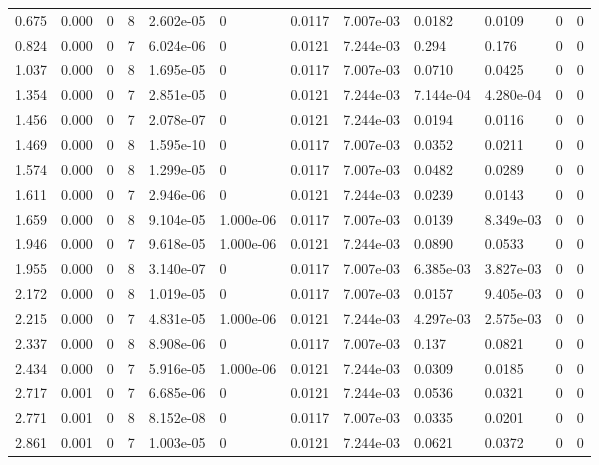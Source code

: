 \documentclass[preview]{standalone}
\begin{document}
{{\begin{tabular}{L{1.2cm}C{1.2cm} C{0.3cm}C{0.5cm} C{1.4cm}C{1.4cm} C{1.4cm}C{1.4cm} C{1.6cm}C{1.6cm} C{1.6cm}C{1.6cm}}
  0.675  &  0.000  & 0     &  8 &  2.602e-05  & 0  &  0.0117&   7.007e-03& 0.0182 & 0.0109   &  0 & 0  \\ 
  0.824  &  0.000  & 0     &  7 &  6.024e-06  & 0  &  0.0121&   7.244e-03& 0.294 & 0.176   &  0 & 0  \\ 
  1.037  &  0.000  & 0     &  8 &  1.695e-05  & 0  &  0.0117&   7.007e-03& 0.0710 & 0.0425   &  0 & 0  \\ 
  1.354  &  0.000  & 0     &  7 &  2.851e-05  & 0  &  0.0121&   7.244e-03& 7.144e-04 & 4.280e-04   &  0 & 0  \\ 
  1.456  &  0.000  & 0     &  7 &  2.078e-07  & 0  &  0.0121&   7.244e-03& 0.0194 & 0.0116   &  0 & 0  \\ 
  1.469  &  0.000  & 0     &  8 &  1.595e-10  & 0  &  0.0117&   7.007e-03& 0.0352 & 0.0211   &  0 & 0  \\ 
  1.574  &  0.000  & 0     &  8 &  1.299e-05  & 0  &  0.0117&   7.007e-03& 0.0482 & 0.0289   &  0 & 0  \\ 
  1.611  &  0.000  & 0     &  7 &  2.946e-06  & 0  &  0.0121&   7.244e-03& 0.0239 & 0.0143   &  0 & 0  \\ 
  1.659  &  0.000  & 0     &  8 &  9.104e-05  & 1.000e-06  &  0.0117&   7.007e-03& 0.0139 & 8.349e-03   &  0 & 0  \\ 
  1.946  &  0.000  & 0     &  7 &  9.618e-05  & 1.000e-06  &  0.0121&   7.244e-03& 0.0890 & 0.0533   &  0 & 0  \\ 
  1.955  &  0.000  & 0     &  8 &  3.140e-07  & 0  &  0.0117&   7.007e-03& 6.385e-03 & 3.827e-03   &  0 & 0  \\ 
  2.172  &  0.000  & 0     &  8 &  1.019e-05  & 0  &  0.0117&   7.007e-03& 0.0157 & 9.405e-03   &  0 & 0  \\ 
  2.215  &  0.000  & 0     &  7 &  4.831e-05  & 1.000e-06  &  0.0121&   7.244e-03& 4.297e-03 & 2.575e-03   &  0 & 0  \\ 
  2.337  &  0.000  & 0     &  8 &  8.908e-06  & 0  &  0.0117&   7.007e-03& 0.137 & 0.0821   &  0 & 0  \\ 
  2.434  &  0.000  & 0     &  7 &  5.916e-05  & 1.000e-06  &  0.0121&   7.244e-03& 0.0309 & 0.0185   &  0 & 0  \\ 
  2.717  &  0.001  & 0     &  7 &  6.685e-06  & 0  &  0.0121&   7.244e-03& 0.0536 & 0.0321   &  0 & 0  \\ 
  2.771  &  0.001  & 0     &  8 &  8.152e-08  & 0  &  0.0117&   7.007e-03& 0.0335 & 0.0201   &  0 & 0  \\ 
  2.861  &  0.001  & 0     &  7 &  1.003e-05  & 0  &  0.0121&   7.244e-03& 0.0621 & 0.0372   &  0 & 0  \\ 

\end{tabular}}}
\end{document}

